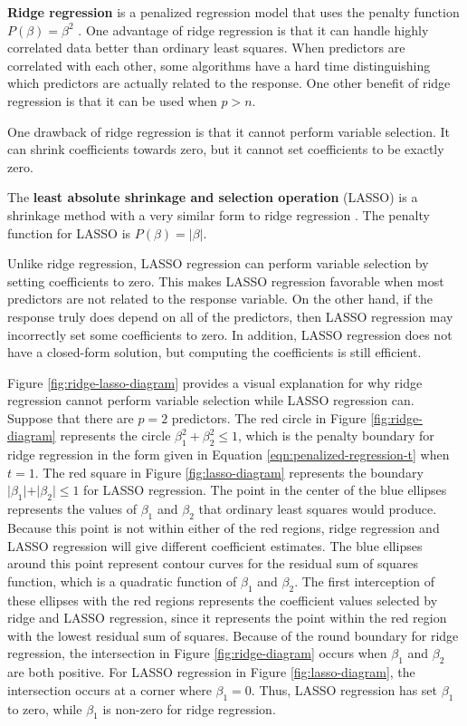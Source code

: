 \documentclass{article}
\begin{document}
\textbf{Ridge regression} is a penalized regression model that uses the penalty function $P(\beta) = \beta^2$ \cite{hoerl1970ridge}. One advantage of ridge regression is that it can handle highly correlated data better than ordinary least squares. When predictors are correlated with each other, some algorithms have a hard time distinguishing which predictors are actually related to the response. One other benefit of ridge regression is that it can be used when $p>n$.

One drawback of ridge regression is that it cannot perform variable selection. It can shrink coefficients towards zero, but it cannot set coefficients to be exactly zero.

The \textbf{least absolute shrinkage and selection operation} (LASSO) is a shrinkage method with a very similar form to ridge regression \cite{tibshirani1996regression, james2017islr, james2013introduction}. The penalty function for LASSO is $P(\beta) = \vert \beta \vert$.

Unlike ridge regression, LASSO regression can perform variable selection by setting coefficients to zero. This makes LASSO regression favorable when most predictors are not related to the response variable. On the other hand, if the response truly does depend on all of the predictors, then LASSO regression may incorrectly set some coefficients to zero. In addition, LASSO regression does not have a closed-form solution, but computing the coefficients is still efficient.

Figure \ref{fig:ridge-lasso-diagram} provides a visual explanation for why ridge regression cannot perform variable selection while LASSO regression can. Suppose that there are $p = 2$ predictors. The red circle in Figure \ref{fig:ridge-diagram} represents the circle $\beta_1^2 + \beta_2^2 \leq 1$, which is the penalty boundary for ridge regression in the form given in Equation \ref{eqn:penalized-regression-t} when $t = 1$. The red square in Figure \ref{fig:lasso-diagram} represents the boundary $\vert \beta_1 \vert + \vert \beta_2 \vert \leq 1$ for LASSO regression. The point in the center of the blue ellipses represents the values of $\beta_1$ and $\beta_2$ that ordinary least squares would produce. Because this point is not within either of the red regions, ridge regression and LASSO regression will give different coefficient estimates. The blue ellipses around this point represent contour curves for the residual sum of squares function, which is a quadratic function of $\beta_1$ and $\beta_2$. The first interception of these ellipses with the red regions represents the coefficient values selected by ridge and LASSO regression, since it represents the point within the red region with the lowest residual sum of squares. Because of the round boundary for ridge regression, the intersection in Figure \ref{fig:ridge-diagram} occurs when $\beta_1$ and $\beta_2$ are both positive. For LASSO regression in Figure \ref{fig:lasso-diagram}, the intersection occurs at a corner where $\beta_1=0$. Thus, LASSO regression has set $\beta_1$ to zero, while $\beta_1$ is non-zero for ridge regression.
\end{document}
